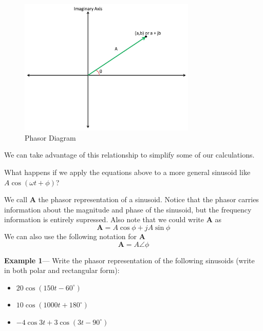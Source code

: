 \documentclass{handout}
\begin{document}
\begin{figure} [h!]
\centering
\includegraphics[width=0.75\textwidth]{PhasorDiagram.jpg}
\caption{Phasor Diagram}
\label{fig: PhasorDiagram}
\end{figure}

We can take advantage of this relationship to simplify some of our calculations.

What happens if we apply the equations above to a more general sinusoid like $A\cos(\omega t + \phi)$?


We call $\mathbf{A}$ the phasor representation of a  sinusoid.  Notice that the phasor carries information about the magnitude and phase of the sinusoid, but the frequency information is entirely supressed.  Also note that we could write $\mathbf{A}$ as
\[
\mathbf{A} = A\cos\phi+jA\sin\phi
\]
We can also use the following notation for $\mathbf{A}$
\[
\mathbf{A} = A\angle\phi
\]

\newpage
\clearpage
\pagebreak

\textbf{Example 1}--- Write the phasor representation of the following sinusoids (write in both polar and rectangular form):
\begin{itemize}
\item $20\cos(150t-60^\circ)$
\item $10\cos(1000t+180^\circ)$
\item $-4\cos 3t + 3\cos(3t-90^\circ)$
\end{itemize}
\end{document}
